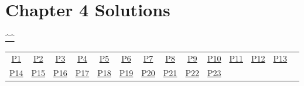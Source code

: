 \section{Chapter 4 Solutions}
\begin{center}\hyperref[toc]{\^{}\^{}}\end{center}
\begin{center}\begin{tabular}{cccccccccccccc}
\hyperref[problem1chapter4]{P1} & \hyperref[problem2chapter4]{P2} & \hyperref[problem3chapter4]{P3} & \hyperref[problem4chapter4]{P4} & \hyperref[problem5chapter4]{P5} & \hyperref[problem6chapter4]{P6} & \hyperref[problem7chapter4]{P7} & \hyperref[problem8chapter4]{P8} & \hyperref[problem9chapter4]{P9} & \hyperref[problem10chapter4]{P10} & \hyperref[problem11chapter4]{P11} & \hyperref[problem12chapter4]{P12} & \hyperref[problem13chapter4]{P13} \\
\hyperref[problem14chapter4]{P14} & \hyperref[problem15chapter4]{P15} & \hyperref[problem16chapter4]{P16} & \hyperref[problem17chapter4]{P17} & \hyperref[problem18chapter4]{P18} & \hyperref[problem19chapter4]{P19} & \hyperref[problem20chapter4]{P20} & \hyperref[problem21chapter4]{P21} & \hyperref[problem22chapter4]{P22} & \hyperref[problem23chapter4]{P23} 
\end{tabular}\end{center}

\setcounter{problem}{0}
\setcounter{solution}{0}

